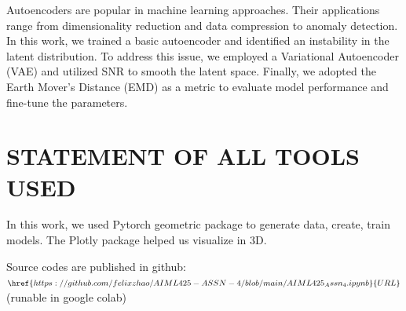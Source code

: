 \documentclass{article}
\begin{document}
Autoencoders are popular in machine learning approaches. Their applications range from dimensionality reduction and data compression to anomaly detection. In this work, we trained a basic autoencoder and identified an instability in the latent distribution. To address this issue, we employed a Variational Autoencoder (VAE) and utilized SNR to smooth the latent space. Finally, we adopted the Earth Mover's Distance (EMD) as a metric to evaluate model performance and fine-tune the parameters.


\section{STATEMENT OF ALL TOOLS USED}
\label{sec:statementofalltoolsused}

In this work, we used Pytorch geometric package to generate data, create, train models. 
The Plotly package helped us visualize in 3D. 

Source codes are published in github: 
$\href{https://github.com/felixzhao/AIML425-ASSN-4/blob/main/AIML425_Assn_4.ipynb}{URL}$
 (runable in google colab)




\vfill\pagebreak



\end{document}
